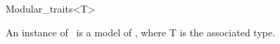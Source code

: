 \begin{ccRefClass}{Modular_traits<T>}

\ccDefinition

An instance of \ccClassTemplateName\ is a model of , 
where {\sc T} is the associated type. 


\ccIsModel
{}\\

\end{ccRefClass} 